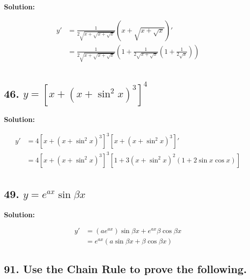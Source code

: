 \documentclass{article}
\newenvironment{solution}{
    \par \textbf{Solution: } \quad \par
}{\par}
\begin{document}
    \begin{solution}
        $$\begin{aligned}
            y' &= \frac{1}{2 \sqrt{x + \sqrt{x + \sqrt x}}}(x + \sqrt{x + \sqrt x})' \\
            &= \frac{1}{2 \sqrt{x + \sqrt{x + \sqrt x}}}(1 + \frac{1}{2 \sqrt{x + \sqrt x}}(1 + \frac{1}{2 \sqrt x})) \\
        \end{aligned}$$
    \end{solution}

    \subsection*{46. $y = [x + (x + \sin ^2 x)^3]^4$}

    \begin{solution}
        $$\begin{aligned}
            y' &= 4[x + (x + \sin^2 x)^3]^3[x + (x + \sin^2 x)^3]' \\
            &= 4[x + (x + \sin^2 x)^3]^3[1 + 3(x + \sin^2 x)^2(1 + 2\sin x \cos x)] \\
        \end{aligned}$$
    \end{solution}

    \subsection*{49. $y = e^{ax}\sin \beta x$}

    \begin{solution}
        $$\begin{aligned}
            y' &= (ae^{ax})\sin \beta x + e^{ax} \beta \cos \beta x \\
            &= e^{ax}(a \sin \beta x + \beta \cos \beta x)
        \end{aligned}$$
    \end{solution}

    \subsection*{91. Use the Chain Rule to prove the following.}
\end{document}
